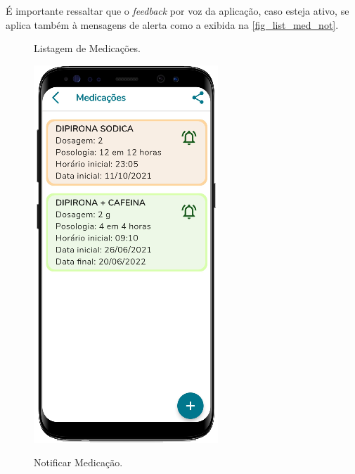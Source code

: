 É importante ressaltar que o \emph{feedback} por voz da aplicação, caso esteja ativo, se aplica também à
mensagens de alerta como a exibida na \autoref{fig_list_med_not}.

\begin{figure}[htb]
    \centering
    \begin{minipage}{0.45\textwidth}
        \centering
        \caption{Listagem de Medicações.}\label{fig_list_med}
        \includegraphics[scale=0.66]{Imagens/desenvolvimento/app/list_med.png}
    \end{minipage}
    \hfill
    \begin{minipage}{0.45\textwidth}
        \centering
        \caption{Notificar Medicação.}\label{fig_list_med_not}

\end{minipage}
\end{figure}
